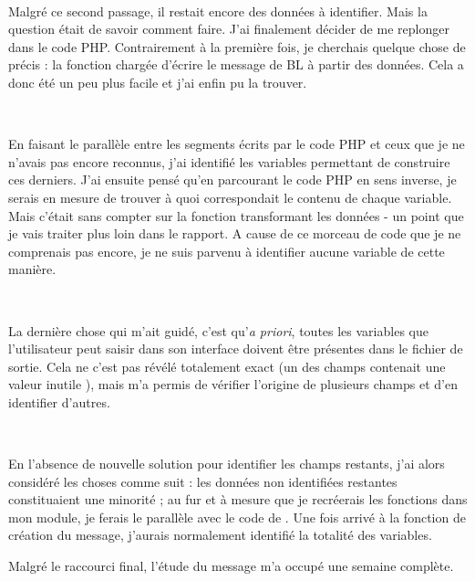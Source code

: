 ~

Malgré ce second passage, il restait encore des données à identifier. Mais la question était de savoir comment faire. J'ai finalement décider de me replonger dans le code PHP. Contrairement à la première fois, je cherchais quelque chose de précis : la fonction chargée d'écrire le message de BL à partir des données. Cela a donc été un peu plus facile et j'ai enfin pu la trouver.

~

En faisant le parallèle entre les segments écrits par le code PHP et ceux que je ne n'avais pas encore reconnus, j'ai identifié les variables permettant de construire ces derniers. J'ai ensuite pensé qu'en parcourant le code PHP en sens inverse, je serais en mesure de trouver à quoi correspondait le contenu de chaque variable. Mais c'était sans compter sur la fonction transformant les données - un point que je vais traiter plus loin dans le rapport. A cause de ce morceau de code que je ne comprenais pas encore, je ne suis parvenu à identifier aucune variable de cette manière.

~

La dernière chose qui m'ait guidé, c'est qu'\emph{a priori}, toutes les variables que l'utilisateur peut saisir dans son interface doivent être présentes dans le fichier de sortie. Cela ne c'est pas révélé totalement exact (un des champs contenait une valeur \og inutile \fg), mais m'a permis de vérifier l'origine de plusieurs champs et d'en identifier d'autres.

~

En l'absence de nouvelle solution pour identifier les champs restants, j'ai alors considéré les choses comme suit : les données non identifiées restantes constituaient une minorité ; au fur et à mesure que je recréerais les fonctions dans mon module, je ferais le parallèle avec le code de \pireus. Une fois arrivé à la fonction de création du message, j'aurais normalement identifié la totalité des variables.

Malgré le raccourci final, l'étude du message m'a occupé une semaine complète.